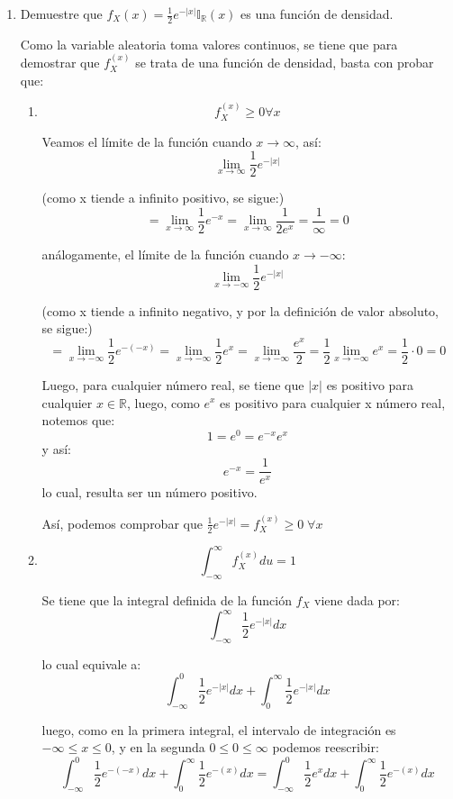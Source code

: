 \documentclass[12pt,a4paper]{report}
\begin{document}
\begin{enumerate}
		\item {
			Demuestre que $f_X(x) = \frac{1}{2}e^{-|x|}\mathbb{I}_\mathbb{R}(x)$ es
			una función de densidad.
		}

			Como la variable aleatoria toma valores continuos, se tiene que para
			demostrar que $f_X^{(x)}$ se trata de una función de densidad, basta con
			probar que:
			\begin{enumerate}
				\item {
					$$f_X^{(x)} \geq 0 \forall x$$

					Veamos el límite de la función cuando $x \rightarrow \infty$, así:
					$$ \lim_{x\to\infty}  \frac{1}{2}e^{-|x|} $$

					(como x tiende a infinito positivo, se sigue:)
					$$ = \lim_{x\to\infty}  \frac{1}{2}e^{-x}
					   = \lim_{x\to\infty}  \frac{1}{2e^{x}} = \frac{1}{\infty} = 0$$

					análogamente, el límite de la función cuando  $x \rightarrow -\infty$:
					$$ \lim_{x\to -\infty}  \frac{1}{2}e^{-|x|} $$

					(como x tiende a infinito negativo, y por la definición de
					valor absoluto, se sigue:)
					$$ = \lim_{x\to -\infty}  \frac{1}{2}e^{-(-x)}
					   = \lim_{x\to -\infty}  \frac{1}{2}e^{x}
					   = \lim_{x\to -\infty}  \frac{e^x}{2}
					   = \frac{1}{2} \lim_{x\to -\infty}  e^x = \frac{1}{2} \cdot 0 = 0$$

					Luego, para cualquier número real, se tiene que $|x|$ es positivo
					para cualquier $x \in \mathbb{R}$, luego, como $e^x$ es positivo
					para cualquier x número real, notemos que:
						$$ 1 = e^0 = e^{-x}e^x $$
					y así:
						$$ e^{-x} = \frac{1}{e^x} $$
					lo cual, resulta ser un número positivo.

					Así, podemos comprobar que $\frac{1}{2}e^{-|x|} = f_X^{(x)} \geq 0 \; \forall x$

				}
				\item {
					$$\int_{-\infty}^{\infty} f_X^{(x)} du = 1$$

					Se tiene que la integral definida de la función $f_X$ viene dada por:
					$$\int_{-\infty}^{\infty} \frac{1}{2}e^{-|x|} dx$$

					lo cual equivale a:
					$$\int_{-\infty}^{0} \frac{1}{2}e^{-|x|} dx +
					  \int_{0}^{\infty} \frac{1}{2}e^{-|x|} dx $$

					luego, como en la primera integral, el intervalo de integración
					es $ -\infty \leq x \leq 0$, y en la segunda $ 0\leq 0 \leq \infty$
					podemos reescribir:
					$$	\int_{-\infty}^{0} \frac{1}{2}e^{-(-x)} dx +
					  	\int_{0}^{\infty} \frac{1}{2}e^{-(x)} dx
					 =  \int_{-\infty}^{0} \frac{1}{2}e^{x} dx +
 					  	\int_{0}^{\infty} \frac{1}{2}e^{-(x)} dx $$

}
\end{enumerate}
\end{enumerate}
\end{document}
